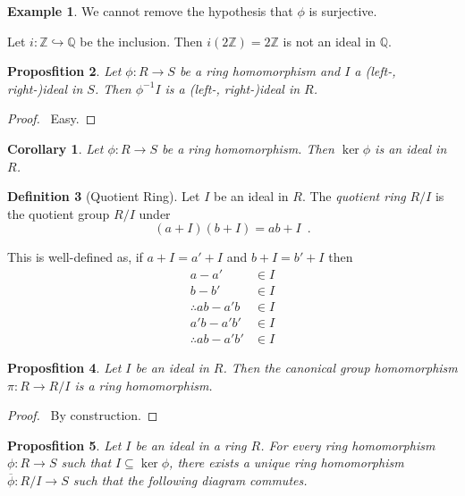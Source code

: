 \documentclass{book}
\let\qed\relax
\newtheorem{prop}{Proposfition}[chapter]
\newtheorem{cor}{Corollary}[prop]
\theoremstyle{definition}
\newtheorem{df}[prop]{Definition}
\newtheorem{ex}[prop]{Example}
\newcommand{\inv}[1]{\ensuremath{{#1}^{-1}}}
\begin{document}
\begin{ex}
We cannot remove the hypothesis that $\phi$ is surjective.

Let $i : \mathbb{Z} \hookrightarrow \mathbb{Q}$ be the inclusion. Then $i(2 \mathbb{Z}) = 2 \mathbb{Z}$ is not an ideal in $\mathbb{Q}$.
\end{ex}

\begin{prop}
Let $\phi : R \rightarrow S$ be a ring homomorphism and $I$ a (left-, right-)ideal in $S$. Then $\inv{\phi}{I}$ is a (left-, right-)ideal in $R$.
\end{prop}

\begin{proof}
\pf\ Easy. \qed
\end{proof}

\begin{cor}
Let $\phi : R \rightarrow S$ be a ring homomorphism. Then $\ker \phi$ is an ideal in $R$.
\end{cor}

\begin{df}[Quotient Ring]
Let $I$ be an ideal in $R$. The \emph{quotient ring} $R / I$ is the quotient group $R/I$ under
\[ (a + I)(b + I) = ab + I \enspace . \]

This is well-defined as, if $a + I = a' + I$ and $b + I = b' + I$ then
\begin{align*}
a-a' & \in I \\
b - b' & \in I \\
\therefore ab - a'b & \in I \\
a'b - a'b' & \in I \\
\therefore ab - a'b' & \in I
\end{align*}
\end{df}

\begin{prop}
Let $I$ be an ideal in $R$. Then the canonical group homomorphism $\pi : R \rightarrow R / I$ is a ring homomorphism.
\end{prop}

\begin{proof}
\pf\ By construction. \qed
\end{proof}

\begin{prop}
Let $I$ be an ideal in a ring $R$. For every ring homomorphism $\phi : R \rightarrow S$ such that $I \subseteq \ker \phi$, there exists a unique ring homomorphism $\overline{\phi} : R / I \rightarrow S$ such that the following diagram commutes.

\begin{center}
\end{center}
\end{prop}
\end{document}
